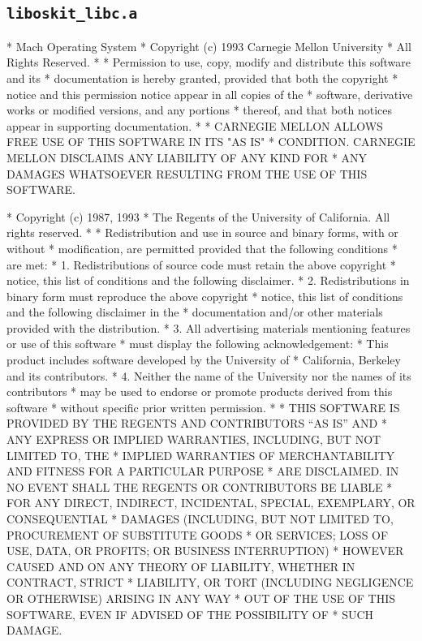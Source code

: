 \subsection{\texttt{liboskit_libc.a}}
\begin{copyrightEnv}
 * Mach Operating System
 * Copyright (c) 1993 Carnegie Mellon University
 * All Rights Reserved.
 *
 * Permission to use, copy, modify and distribute this software and its
 * documentation is hereby granted, provided that both the copyright
 * notice and this permission notice appear in all copies of the
 * software, derivative works or modified versions, and any portions
 * thereof, and that both notices appear in supporting documentation.
 *
 * CARNEGIE MELLON ALLOWS FREE USE OF THIS SOFTWARE IN ITS "AS IS"
 * CONDITION.  CARNEGIE MELLON DISCLAIMS ANY LIABILITY OF ANY KIND FOR
 * ANY DAMAGES WHATSOEVER RESULTING FROM THE USE OF THIS SOFTWARE.
\end{copyrightEnv}

\begin{copyrightEnv}
 * Copyright (c) 1987, 1993
 *      The Regents of the University of California.  All rights reserved.
 *
 * Redistribution and use in source and binary forms, with or without
 * modification, are permitted provided that the following conditions
 * are met:
 * 1. Redistributions of source code must retain the above copyright
 *    notice, this list of conditions and the following disclaimer.
 * 2. Redistributions in binary form must reproduce the above copyright
 *    notice, this list of conditions and the following disclaimer in the
 *    documentation and/or other materials provided with the distribution.
 * 3. All advertising materials mentioning features or use of this software
 *    must display the following acknowledgement:
 *      This product includes software developed by the University of
 *      California, Berkeley and its contributors.
 * 4. Neither the name of the University nor the names of its contributors
 *    may be used to endorse or promote products derived from this software
 *    without specific prior written permission.
 *
 * THIS SOFTWARE IS PROVIDED BY THE REGENTS AND CONTRIBUTORS ``AS IS'' AND
 * ANY EXPRESS OR IMPLIED WARRANTIES, INCLUDING, BUT NOT LIMITED TO, THE
 * IMPLIED WARRANTIES OF MERCHANTABILITY AND FITNESS FOR A PARTICULAR PURPOSE
 * ARE DISCLAIMED.  IN NO EVENT SHALL THE REGENTS OR CONTRIBUTORS BE LIABLE
 * FOR ANY DIRECT, INDIRECT, INCIDENTAL, SPECIAL, EXEMPLARY, OR CONSEQUENTIAL
 * DAMAGES (INCLUDING, BUT NOT LIMITED TO, PROCUREMENT OF SUBSTITUTE GOODS
 * OR SERVICES; LOSS OF USE, DATA, OR PROFITS; OR BUSINESS INTERRUPTION)
 * HOWEVER CAUSED AND ON ANY THEORY OF LIABILITY, WHETHER IN CONTRACT, STRICT
 * LIABILITY, OR TORT (INCLUDING NEGLIGENCE OR OTHERWISE) ARISING IN ANY WAY
 * OUT OF THE USE OF THIS SOFTWARE, EVEN IF ADVISED OF THE POSSIBILITY OF
 * SUCH DAMAGE.
\end{copyrightEnv}

